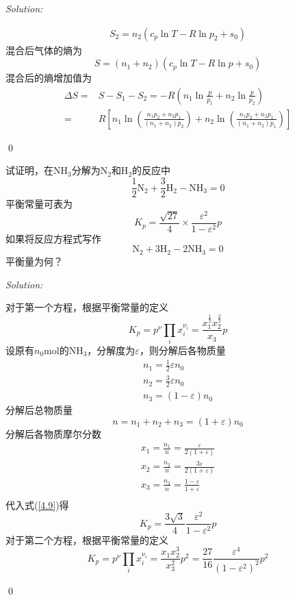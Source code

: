 \documentclass[12pt,a4paper]{article}
\newenvironment{problem}[2][Problem]{\begin{trivlist}
\item[\hskip \labelsep {\bfseries #1}\hskip \labelsep {\bfseries #2.}]}{\end{trivlist}}
\newenvironment{sol}
    {\emph{Solution:}
    }
    {
    \qed
    }
\begin{document}
\begin{sol}
\begin{itemize}
\begin{gather}
S_2=n_2(c_p\ln T-R\ln p_2+s_0)
\end{gather}
混合后气体的熵为
\begin{equation}
S=(n_1+n_2)(c_p\ln T-R\ln p+s_0)
\end{equation}
混合后的熵增加值为
\begin{align}
\nonumber\Delta S=&S-S_1-S_2=-R(n_1\ln\frac{p}{p_1}+n_2\ln\frac{p}{p_2})\\
=&R\left[n_1\ln\left(\frac{n_1p_2+n_2p_1}{(n_1+n_2)p_2}\right)+n_2\ln\left(\frac{n_1p_2+n_2p_1}{(n_1+n_2)p_1}\right)\right]
\end{align}
\end{itemize}
\end{sol}

\begin{problem}{4.9}
试证明，在NH$_3$分解为N$_2$和H$_2$的反应中
\[
\frac{1}{2}\text{N}_2+\frac{3}{2}\text{H}_2-\text{NH}_3=0
\]
平衡常量可表为
\[
K_p=\frac{\sqrt{27}}{4}\times\frac{\varepsilon^2}{1-\varepsilon^2}p
\]
如果将反应方程式写作
\[
\text{N}_2+3\text{H}_2-2\text{NH}_3=0
\]
平衡量为何？
\end{problem}
\begin{sol}
对于第一个方程，根据平衡常量的定义
\begin{equation}
\label{4.9}K_p=p^{\nu}\prod_ix_i^{\nu_i}=\frac{x_1^{\frac{1}{2}}x_2^{\frac{3}{2}}}{x_3}p
\end{equation}
设原有$n_0$mol的NH$_3$，分解度为$\varepsilon$，则分解后各物质量
\begin{gather}
n_1=\frac{1}{2}\varepsilon n_0\\
n_2=\frac{3}{2}\varepsilon n_0\\
n_3=(1-\varepsilon)n_0
\end{gather}
分解后总物质量
\begin{equation}
n=n_1+n_2+n_3=(1+\varepsilon)n_0
\end{equation}
分解后各物质摩尔分数
\begin{gather}
x_1=\frac{n_1}{n}=\frac{\varepsilon}{2(1+\varepsilon)}\\
x_2=\frac{n_2}{n}=\frac{3\varepsilon}{2(1+\varepsilon)}\\
x_3=\frac{n_3}{n}=\frac{1-\varepsilon}{1+\varepsilon}\\
\end{gather}
代入式(\ref{4.9})得
\begin{equation}
K_p=\frac{3\sqrt{3}}{4}\frac{\varepsilon^2}{1-\varepsilon^2}p
\end{equation}
对于第二个方程，根据平衡常量的定义
\begin{equation}
K_p=p^{\nu}\prod_ix_i^{\nu_i}=\frac{x_1x_2^{3}}{x_3^2}p^2=\frac{27}{16}\frac{\varepsilon^4}{(1-\varepsilon^2)^2}p^2
\end{equation}
\end{sol}
\end{document}
